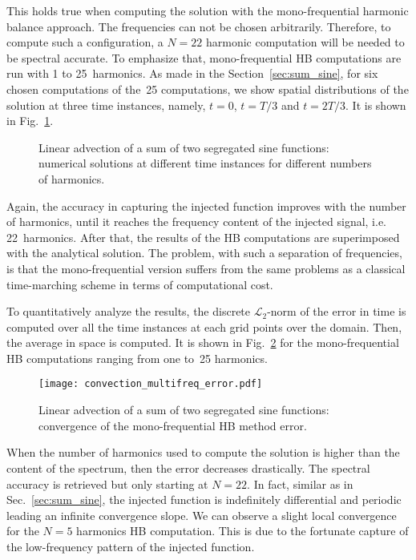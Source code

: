 This holds true when computing the solution with the mono-frequential
harmonic balance approach. The frequencies can not be chosen arbitrarily.
Therefore, to compute such a configuration, a $N=22$ harmonic computation
will be needed to be spectral accurate. To emphasize that, mono-frequential
HB computations are run with 1 to 25~harmonics.
As made in the Section~\ref{sec:sum_sine}, 
for six chosen computations of the~25 computations, 
we show spatial distributions of the solution
at three time instances, namely, $t=0$, $t=T/3$ and $t=2T/3$.
It is shown in Fig.~\ref{fig:inj_multifreq_tsm}.
\begin{figure}[htb]
  \centering
  \caption{Linear advection of a sum of two segregated sine functions: 
  numerical solutions at different time instances for different numbers of harmonics.}
  \label{fig:inj_multifreq_tsm}
\end{figure}
Again, the accuracy in capturing the injected function
improves with the number of harmonics,
until it reaches the frequency content
of the injected signal, i.e. 22~harmonics.
After that, the results of the HB computations are
superimposed with the analytical solution. 
The problem, with such a separation of frequencies, is that 
the mono-frequential version suffers from the same
problems as a classical time-marching scheme in terms of 
computational cost.

To quantitatively analyze the results,
the discrete $\mathcal{L}_2$-norm of the error 
in time is computed over all the time instances
at each grid points over the domain.
Then, the average in space is computed.
It is shown in Fig.~\ref{fig:conv_multifreq_tsm} for the
mono-frequential HB computations ranging from one to~25
harmonics.
\begin{figure}[htb]
  \centering
  \texttt{[image: convection\_multifreq\_error.pdf]}
  \caption{Linear advection of a sum of two segregated sine functions: convergence of the mono-frequential HB method error.}
  \label{fig:conv_multifreq_tsm}
\end{figure}
When the number of harmonics
used to compute the solution is higher than the content of the spectrum,
then the error decreases drastically. The spectral accuracy is retrieved
but only starting at $N=22$.
In fact, similar as in Sec.~\ref{sec:sum_sine},
the injected function is indefinitely differential and periodic
leading an infinite convergence slope. We can observe a slight local convergence
for the $N=5$ harmonics HB computation. This is due to the fortunate 
capture of the low-frequency pattern of the injected function.

